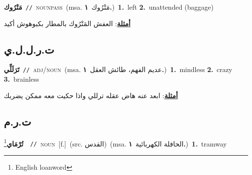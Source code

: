 \documentclass[10pt,a4paper,twoside]{article} %
\begin{document}
\begin{multicols}{2}
{{{{{{{{{{\setlength\topsep{0pt}\textbf{\foreignlanguage{arabic}{مَتْرُوك}}\ {\color{gray}\texttt{//}\color{black}}\ \textsc{noun\textunderscore pass}\ \color{gray}(msa. \foreignlanguage{arabic}{مَتْرُوك}~\foreignlanguage{arabic}{\textbf{١.}})\color{black}\ \textbf{1.}~left  \textbf{2.}~unattended (baggage)\  \begin{flushright}\color{gray}\foreignlanguage{arabic}{\textbf{\underline{\foreignlanguage{arabic}{أمثلة}}}: العفش المَتْرُوك بالمطار بكبوهوش أكيد}\end{flushright}\color{black}} \vspace{2mm}

\vspace{-3mm}
\subsection*{\color{blue}\foreignlanguage{arabic}{ت.ر.ل.ل.ي}\color{blue}{ (ntws)}} 

{\setlength\topsep{0pt}\textbf{\foreignlanguage{arabic}{تَرَلَلِّي}}\ {\color{gray}\texttt{//}\color{black}}\ \textsc{adj/noun}\ \color{gray}(msa. \foreignlanguage{arabic}{عديم الفهم، طائش العقل}~\foreignlanguage{arabic}{\textbf{١.}})\color{black}\ \textbf{1.}~mindless  \textbf{2.}~crazy  \textbf{3.}~brainless\  \begin{flushright}\color{gray}\foreignlanguage{arabic}{\textbf{\underline{\foreignlanguage{arabic}{أمثلة}}}: ابعد عنه هاض عقله ترللي واذا حكيت معه ممكن يضربك}\end{flushright}\color{black}} \vspace{2mm}

\vspace{-3mm}
\subsection*{\color{blue}\foreignlanguage{arabic}{ت.ر.م}\color{blue}{ (ntws)}} 

{\setlength\topsep{0pt}\textbf{\foreignlanguage{arabic}{تُرْمَاي}}\footnote{English loanword}\ \ {\color{gray}\texttt{//}\color{black}}\ \textsc{noun}\ [f.]\ (src. \color{gray}\foreignlanguage{arabic}{القدس}\color{black})\ \color{gray}(msa. \foreignlanguage{arabic}{الحافلة الكهربائية}~\foreignlanguage{arabic}{\textbf{١.}})\color{black}\ \textbf{1.}~tramway\ 

}}}}}}}}}}
\end{multicols}
\end{document}
